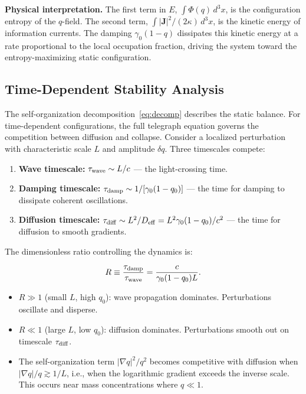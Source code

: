 \documentclass[aps,prd,twocolumn,showpacs,superscriptaddress,preprintnumbers]{revtex4-2}
\begin{document}
\textbf{Physical interpretation.}
The first term in $E$, $\int\Phi(q)\,d^3x$, is the configuration entropy of the $q$-field.
The second term, $\int|\mathbf{J}|^2/(2\kappa)\,d^3x$, is the kinetic energy of information currents.
The damping $\gamma_0(1-q)$ dissipates this kinetic energy at a rate proportional to the local occupation fraction, driving the system toward the entropy-maximizing static configuration.

\subsection{Time-Dependent Stability Analysis}
\label{sec:stability}

The self-organization decomposition~\eqref{eq:decomp} describes the static balance.
For time-dependent configurations, the full telegraph equation governs the competition between diffusion and collapse.
Consider a localized perturbation with characteristic scale $L$ and amplitude $\delta q$.
Three timescales compete:

\begin{enumerate}
    \item \textbf{Wave timescale:} $\tau_{\rm wave} \sim L/c$ --- the light-crossing time.
    \item \textbf{Damping timescale:} $\tau_{\rm damp} \sim 1/[\gamma_0(1-q_0)]$ --- the time for damping to dissipate coherent oscillations.
    \item \textbf{Diffusion timescale:} $\tau_{\rm diff} \sim L^2/D_{\rm eff} = L^2\gamma_0(1-q_0)/c^2$ --- the time for diffusion to smooth gradients.
\end{enumerate}

The dimensionless ratio controlling the dynamics is:

\begin{equation}
R \equiv \frac{\tau_{\rm damp}}{\tau_{\rm wave}} = \frac{c}{\gamma_0(1-q_0)L}.
\label{eq:stability_R}
\end{equation}

\begin{itemize}
    \item $R\gg1$ (small $L$, high $q_0$): wave propagation dominates. Perturbations oscillate and disperse.
    \item $R\ll1$ (large $L$, low $q_0$): diffusion dominates. Perturbations smooth out on timescale $\tau_{\rm diff}$.
    \item The self-organization term $|\nabla q|^2/q^2$ becomes competitive with diffusion when $|\nabla q|/q \gtrsim 1/L$, i.e., when the logarithmic gradient exceeds the inverse scale. This occurs near mass concentrations where $q\ll1$.
\end{itemize}
\end{document}
